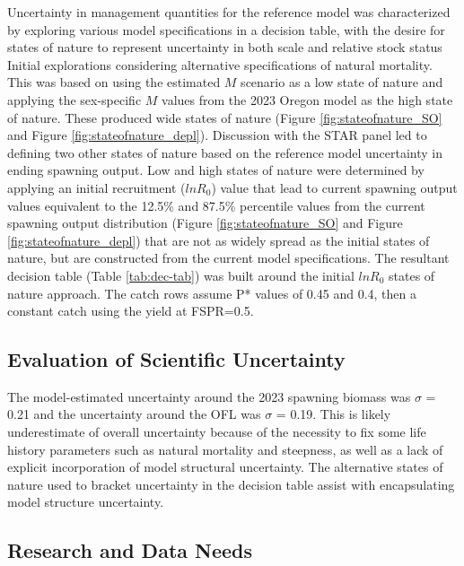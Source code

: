 \documentclass[11pt,
  english,
  letterpaper,
]{article}
\begin{document}
Uncertainty in management quantities for the reference model was characterized by exploring various model specifications in a decision table, with the desire for states of nature to represent uncertainty in both scale and relative stock status Initial explorations considering alternative specifications of natural mortality. This was based on using the estimated \(M\) scenario as a low state of nature and applying the sex-specific \(M\) values from the 2023 Oregon model as the high state of nature. These produced wide states of nature (Figure \ref{fig:stateofnature_SO} and Figure \ref{fig:stateofnature_depl}). Discussion with the STAR panel led to defining two other states of nature based on the reference model uncertainty in ending spawning output. Low and high states of nature were determined by applying an initial recruitment (\(lnR_0\)) value that lead to current spawning output values equivalent to the 12.5\% and 87.5\% percentile values from the current spawning output distribution (Figure \ref{fig:stateofnature_SO} and Figure \ref{fig:stateofnature_depl}) that are not as widely spread as the initial states of nature, but are constructed from the current model specifications. The resultant decision table (Table \ref{tab:dec-tab}) was built around the initial \(lnR_0\) states of nature approach. The catch rows assume P* values of 0.45 and 0.4, then a constant catch using the yield at FSPR=0.5.

\hypertarget{evaluation-of-scientific-uncertainty}{%
\subsection{Evaluation of Scientific Uncertainty}\label{evaluation-of-scientific-uncertainty}}

The model-estimated uncertainty around the 2023 spawning biomass was \(\sigma\) = 0.21 and the uncertainty around the OFL was \(\sigma\) = 0.19. This is likely underestimate of overall uncertainty because of the necessity to fix some life history parameters such as natural mortality and steepness, as well as a lack of explicit incorporation of model structural uncertainty. The alternative states of nature used to bracket uncertainty in the decision table assist with encapsulating model structure uncertainty.

\hypertarget{research-and-data-needs-1}{%
\subsection{Research and Data Needs}\label{research-and-data-needs-1}}
\end{document}
